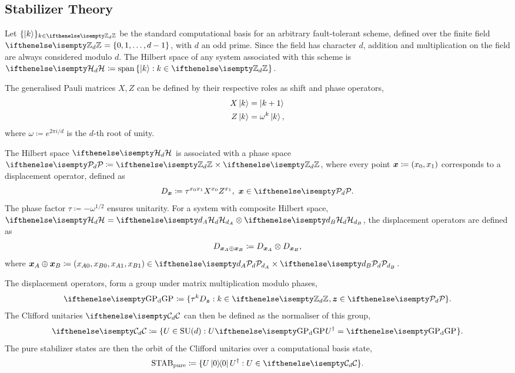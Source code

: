 \documentclass[pra,
aps,
twocolumn,
superscriptaddress,
groupedaddress,
nofootinbib,
reprint
]{revtex4-1}
\begin{document}
\subsection{Stabilizer Theory}\label{sec:so}

Let $\{\ket{k}\}_{k \in \zd}$ be the standard computational basis for an arbitrary fault-tolerant scheme, defined over the finite field $\zd = \{ 0, 1, \dots,d-1 \}$, with $d$ an odd prime. 
Since the field has character $d$, addition and multiplication on the field are always considered modulo $d$.
The Hilbert space of any system associated with this scheme is $\hd \coloneqq \spanv{\ket{k}: k \in \zd}$.

The generalised Pauli matrices $X, Z$ can be defined by their respective roles as shift and phase operators,
\begin{align}
    X \ket{k} &= \ket{k + 1} \label{eq:xpauli}\\
	Z \ket{k} &= \omega^k \ket{k}, \label{eq:zpauli}
\end{align}
where $\omega \coloneqq e^{2\pi i/d}$ is the $d$-th root of unity. 

The Hilbert space $\hd$ is associated with a phase space $\pd \coloneqq \zd \times \zd$, where every point $\bm{x} \coloneqq (x_0, x_1)$ corresponds to a displacement operator, defined as
\begin{equation}\label{eq:ddef}
    D_{\bmx} \coloneqq \tau^{x_0 x_1} X^{x_0} Z^{x_1},\ \bmx  \in \pd.
\end{equation}
The phase factor $\tau \coloneqq -\omega^{1/2}$ ensures unitarity.
For a system with composite Hilbert space, $\hd = \hd[d_A] \otimes \hd[d_B]$, the displacement operators are defined as
\begin{equation}\label{eq:composited}
    D_{\bm{x}_A \oplus \bm{x}_B} \coloneqq D_{\bm{x}_A} \otimes D_{\bm{x}_B},
\end{equation}
where $\bmx_A \oplus \bmx_B \coloneqq (x_{A0}, x_{B0}, x_{A1}, x_{B1}) \in \pd[d_A] \times \pd[d_B]$.

The displacement operators, form a group under matrix multiplication modulo phases,
\begin{equation}\label{eq:gp}
    \gp \coloneqq \{ \tau^k D_{\bmz}: k \in \zd, \bmz \in \pd\}.
\end{equation}
The Clifford unitaries $\cd$ can then be defined as the normaliser of this group, 
\begin{equation}
    \cd \coloneqq \{ U \in {\rm{SU}}(d): U\gp U^\dagger = \gp \}.
\end{equation}
The pure stabilizer states are then the orbit of the Clifford unitaries over a computational basis state,
\begin{equation}\label{eq:stab}
    \stab_{{\rm{pure}}} \coloneqq \{ U\ketbra{0}{0}U^\dagger: U \in \cd \}.
\end{equation}
\end{document}
